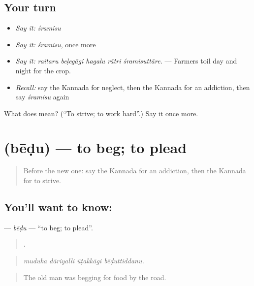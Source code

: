 \subsection*{Your turn}
\begin{itemize}
\raggedright
  \item \emph{Say it:} \emph{śramisu}
  \item \emph{Say it:} \emph{śramisu}, once more
  \item \emph{Say it:} \emph{raitaru beḷegāgi hagalu rātri śramisuttāre.} — Farmers toil day and night for the crop.
  \item \emph{Recall:} say the Kannada for neglect, then the Kannada for an addiction, then say \emph{śramisu} again
\end{itemize}

\begin{tcolorbox}[breakable,colback=teal!4,colframe=teal!35!black,title={Before you move on}]
What does  mean? (\textquotedblleft{}To strive; to work hard\textquotedblright{}.) Say it once more.
\end{tcolorbox}
\section[\texorpdfstring{\kn{ಬೇಡು} (bēḍu)}{ಬೇಡು (bēḍu)}]{ (bēḍu) — to beg; to plead}

\label{lesson:KA-C505-bedu}



\begin{quote}
Before the new one: say the Kannada for an addiction, then the Kannada for to strive.
\end{quote}

\subsection*{You'll want to know: }
\textbf{} — \emph{bēḍu} — \textquotedblleft{}to beg; to plead\textquotedblright{}.

\begin{quote}
   .
\end{quote}

\begin{quote}
\emph{muduka dāriyalli ūṭakkāgi bēḍuttiddanu.}
\end{quote}

\begin{quote}
The old man was begging for food by the road.
\end{quote}

